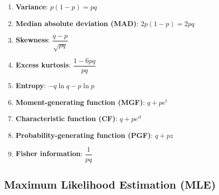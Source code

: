 \begin{enumerate}
    \item \textbf{Variance}:
    $
         {\displaystyle p(1-p)=pq}
    $
    \hfill \cite{wiki/Bernoulli_distribution}

    \item \textbf{Median absolute deviation (MAD)}:
    $
         {\displaystyle 2p(1-p)=2pq}
    $
    \hfill \cite{wiki/Bernoulli_distribution}

    \item \textbf{Skewness}:
    $
         {\displaystyle {\dfrac {q-p}{\sqrt {pq}}}}
    $
    \hfill \cite{wiki/Bernoulli_distribution}

    \item \textbf{Excess kurtosis}:
    $
         {\displaystyle {\dfrac {1-6pq}{pq}}}
    $
    \hfill \cite{wiki/Bernoulli_distribution}

    \item \textbf{Entropy}:
    $
         {\displaystyle -q\ln q-p\ln p}
    $
    \hfill \cite{wiki/Bernoulli_distribution}

    \item \textbf{Moment-generating function (MGF)}:
    $
         {\displaystyle q+pe^{t}}
    $
    \hfill \cite{wiki/Bernoulli_distribution}

    \item \textbf{Characteristic function (CF)}:
    $
         {\displaystyle q+pe^{it}}
    $
    \hfill \cite{wiki/Bernoulli_distribution}

    \item \textbf{Probability-generating function (PGF)}:
    $
         {\displaystyle q+pz}
    $
    \hfill \cite{wiki/Bernoulli_distribution}

    \item \textbf{Fisher information}:
    $
         {\displaystyle {\dfrac {1}{pq}}}
    $
    \hfill \cite{wiki/Bernoulli_distribution}
\end{enumerate}





\subsection{Maximum Likelihood Estimation (MLE)}


